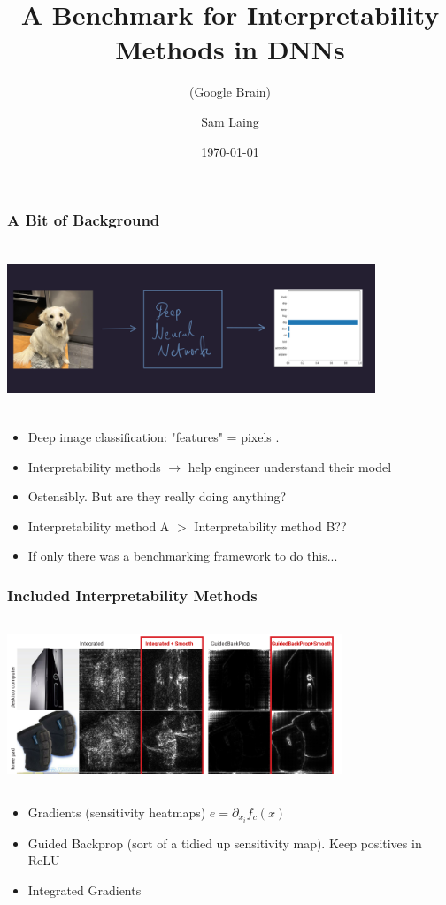 \documentclass{beamer}
\theoremstyle{mystyle}
\begin{document}
\title{A Benchmark for Interpretability Methods in DNNs}
\subtitle{(Google Brain)}
\author{Sam Laing }
\date{\today}
\begin{frame}
\titlepage
\end{frame}
\begin{frame}
	\frametitle{A Bit of Background}
	\includegraphics[width = 11cm, height = 5cm]{dog_net2.png} \pause
	\begin{itemize}
		\item Deep image classification: "features" = pixels .\pause
		\item Interpretability methods $\to$ help engineer understand their model\pause
		\item Ostensibly. But are they really doing anything?
		\item Interpretability method A $>$ Interpretability method B??\pause
		\item If only there was a benchmarking framework to do this...
	\end{itemize}
\end{frame}


\begin{frame}
	\frametitle{Included Interpretability Methods}
	\includegraphics[width=10cm, height=5cm]{compareSGBP.png}

	\begin{itemize}
	
	\item Gradients (sensitivity heatmaps) $e = \partial_{x_i} f_c(x) $ \pause

	\item Guided Backprop (sort of a tidied up sensitivity map). Keep positives in ReLU \pause
	\item Integrated Gradients
	
	\end{itemize}
\end{frame}
\end{document}
